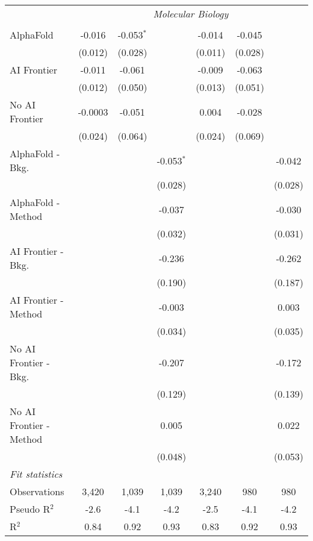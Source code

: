 \begin{tabular}{lcccccc}
 & \multicolumn{6}{c}{\textit{Molecular Biology}} \\ \\
   AlphaFold               & -0.016  & -0.053$^{*}$ &              & -0.014  & -0.045  &   \\   
                           & (0.012) & (0.028)      &              & (0.011) & (0.028) &   \\   
   AI Frontier             & -0.011  & -0.061       &              & -0.009  & -0.063  &   \\   
                           & (0.012) & (0.050)      &              & (0.013) & (0.051) &   \\   
   No AI Frontier          & -0.0003 & -0.051       &              & 0.004   & -0.028  &   \\   
                           & (0.024) & (0.064)      &              & (0.024) & (0.069) &   \\   
   AlphaFold - Bkg.        &         &              & -0.053$^{*}$ &         &         & -0.042\\   
                           &         &              & (0.028)      &         &         & (0.028)\\   
   AlphaFold - Method      &         &              & -0.037       &         &         & -0.030\\   
                           &         &              & (0.032)      &         &         & (0.031)\\   
   AI Frontier - Bkg.      &         &              & -0.236       &         &         & -0.262\\   
                           &         &              & (0.190)      &         &         & (0.187)\\   
   AI Frontier - Method    &         &              & -0.003       &         &         & 0.003\\   
                           &         &              & (0.034)      &         &         & (0.035)\\   
   No AI Frontier - Bkg.   &         &              & -0.207       &         &         & -0.172\\   
                           &         &              & (0.129)      &         &         & (0.139)\\   
   No AI Frontier - Method &         &              & 0.005        &         &         & 0.022\\   
                           &         &              & (0.048)      &         &         & (0.053)\\   
   \midrule
   \emph{Fit statistics}\\
   Observations            & 3,420   & 1,039        & 1,039        & 3,240   & 980     & 980\\  
   Pseudo R$^2$            & -2.6    & -4.1         & -4.2         & -2.5    & -4.1    & -4.2\\  
   R$^2$                   & 0.84    & 0.92         & 0.93         & 0.83    & 0.92    & 0.93\\  
   

\end{tabular}
